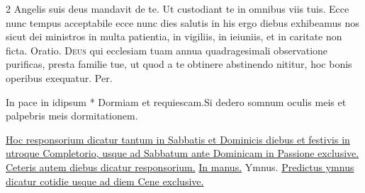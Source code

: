 \begin{multicols*}{2}
{}
\newline \V Angelis suis deus mandavit de te.
\newline \R Ut custodiant te in omnibus viis tuis.
 Ecce nunc tempus acceptabile ecce nunc dies salutis in his ergo diebus exhibeamus nos sicut dei ministros in multa patientia, in vigiliis, in ieiuniis, et in caritate non ficta. {\color{Red} Oratio.}
\lettrine[lines=2]{\zallmancaps \color{Red} D}{eus} qui ecclesiam tuam annua quadragesimali observatione purificas, presta familie tue, ut quod a te obtinere abstinendo nititur, hoc bonis operibus exequatur. Per.
\begin{responsory-breve}[in-pace]
{In pace in idipsum * Dormiam et requiescam.}{Si dedero somnum oculis meis et palpebris meis dormitationem.}
\end{responsory-breve}%
\newline \ul{Hoc responsorium dicatur tantum in Sabbatis et Dominicis diebus et festivis in utroque Completorio, usque ad Sabbatum ante Dominicam in Passione exclusive. Ceteris autem diebus dicatur responsorium.} \hyperlink{in-manus-tuas-breve}{In manus.} {\color{Red} Ymnus.}
\newline \ul{Predictus ymnus dicatur cotidie usque ad diem Cene exclusive.}

\end{multicols*}
